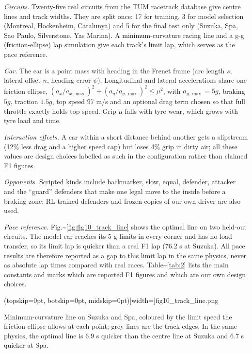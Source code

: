 \documentclass{ieeeaccess}
\begin{document}
\emph{Circuits.} Twenty-five real circuits from the TUM racetrack database \cite{b12} give
centre lines and track widths. They are split once: 17 for training, 3 for model
selection (Montreal, Hockenheim, Catalunya) and 5 for the final test only (Suzuka,
Spa, Sao Paulo, Silverstone, Yas Marina). A minimum-curvature racing line and a
g-g (friction-ellipse) lap simulation give each track's limit lap, which serves as
the pace reference.

\emph{Car.} The car is a point mass with heading in the Frenet frame (arc length \(s\),
lateral offset \(n\), heading error \(\psi\)). Longitudinal and lateral accelerations
share one friction ellipse,
\((a_x/a_{x,\max})^2+(a_y/a_{y,\max})^2\le \mu^2\), with \(a_{y,\max}=5g\), braking
\(5g\), traction \(1.5g\), top speed 97 m/s and an optional drag term chosen so that
full throttle exactly holds top speed. Grip \(\mu\) falls with tyre wear, which grows
with tyre load and time.

\emph{Interaction effects.} A car within a short distance behind another gets a
slipstream (12\% less drag and a higher speed cap) but loses 4\% grip in dirty air;
all these values are design choices labelled as such in the configuration rather
than claimed F1 figures.

\emph{Opponents.} Scripted kinds include backmarker, slow, equal, defender, attacker
and the ``guard'' defenders that make one legal move to the inside before a braking
zone; RL-trained defenders and frozen copies of our own driver are also used.

\emph{Pace reference.} Fig.\textasciitilde{}\ref{fig:fig10_track_line} shows the optimal line on two held-out circuits. The model
car reaches its 5 g limits in every corner and has no load transfer, so its limit
lap is quicker than a real F1 lap (76.2 s at Suzuka). All pace results are
therefore reported as a gap to this limit lap in the same physics, never as
absolute lap times compared with real races. Table\textasciitilde{}\ref{tab:2} lists the main constants and
marks which are reported F1 figures and which are our own design choices.

\Figure[t!](topskip=0pt, botskip=0pt, midskip=0pt)[width=\textwidth]{fig10_track_line.png}
{\parbox{0.92\textwidth}{Minimum-curvature line on Suzuka and Spa, coloured by the limit speed the friction ellipse allows at each point; grey lines are the track edges. In the same physics, the optimal line is 6.9 s quicker than the centre line at Suzuka and 6.7 s quicker at Spa.}\label{fig:fig10_track_line}}
\end{document}
